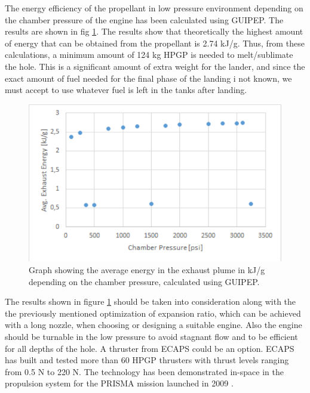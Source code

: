 The energy efficiency of the propellant in low pressure environment depending on the chamber pressure of the engine has been calculated using GUIPEP. The results are shown in fig \ref{guigraf}. The results show that theoretically the highest amount of energy that can be obtained from the propellant is 2.74 kJ/g. Thus, from these calculations, a minimum amount of 124 kg HPGP is needed to melt/sublimate the hole.  This is a significant amount of extra weight for the lander, and since the exact amount of fuel needed for the final phase of the landing i not known, we must accept to use whatever fuel is left in the tanks after landing. 

\begin{figure}[htb]
\begin{center}
\includegraphics[scale=0.8]{figures/navtheory/guigraf}
\caption{Graph showing the average energy in the exhaust plume in kJ/g depending on the chamber pressure, calculated using GUIPEP.}
\label{guigraf}
\end{center}
\end{figure}

The results shown in figure \ref{guigraf} should be taken into consideration along with the the previously mentioned optimization of expansion ratio, which can be achieved with a long nozzle, when choosing or designing a suitable engine. Also the engine should be turnable in the low pressure to avoid stagnant flow and to be efficient for all depths of the hole. A thruster from ECAPS could be an option. ECAPS has built and tested more than 60 HPGP thrusters with thrust levels ranging from 0.5 N to 220 N. The technology has been demonstrated in-space in the propulsion system for the PRISMA mission launched in 2009 \cite{Walter_2014}.



